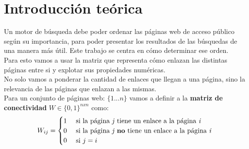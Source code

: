 \section{Introducción teórica}





Un motor de búsqueda debe poder ordenar las páginas web de acceso público según su importancia, para poder presentar los resultados de las búsquedas de una manera más útil. Este trabajo se centra en cómo determinar ese orden. \\

Para esto vamos a usar la matriz que representa cómo enlazan las distintas páginas entre si y explotar sus propiedades numéricas. \\

No solo vamos a ponderar la cantidad de enlaces que llegan a una página, sino la relevancia de las páginas que enlazan a las mismas. \\

Para un conjunto de páginas web: $\{1 ... n\}$ vamos a definir a la \textbf{matriz de conectividad} $ W \in \{0, 1\}^{nxn} $ como: \\

\[ W_{ij} =
	\begin{cases}
		1 & \text{ si la página \textit{j} tiene un enlace a la página \textit{i} } \\
		0 & \text{ si la página \textit{j} \textbf{no} tiene un enlace a la página \textit{i} } \\
		0 & \text{ si $j = i$}
	\end{cases}
\]

